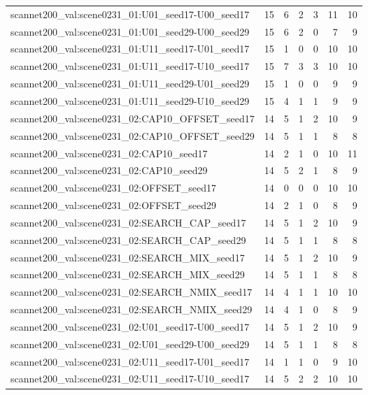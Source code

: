 \begin{table}[t]
\begin{tabular}{lrrrrrr}
scannet200\_val:scene0231\_01:U01\_seed17-U00\_seed17 & 15 & 6 & 2 & 3 & 11 & 10 \\
scannet200\_val:scene0231\_01:U01\_seed29-U00\_seed29 & 15 & 6 & 2 & 0 & 7 & 9 \\
scannet200\_val:scene0231\_01:U11\_seed17-U01\_seed17 & 15 & 1 & 0 & 0 & 10 & 10 \\
scannet200\_val:scene0231\_01:U11\_seed17-U10\_seed17 & 15 & 7 & 3 & 3 & 10 & 10 \\
scannet200\_val:scene0231\_01:U11\_seed29-U01\_seed29 & 15 & 1 & 0 & 0 & 9 & 9 \\
scannet200\_val:scene0231\_01:U11\_seed29-U10\_seed29 & 15 & 4 & 1 & 1 & 9 & 9 \\
scannet200\_val:scene0231\_02:CAP10\_OFFSET\_seed17 & 14 & 5 & 1 & 2 & 10 & 9 \\
scannet200\_val:scene0231\_02:CAP10\_OFFSET\_seed29 & 14 & 5 & 1 & 1 & 8 & 8 \\
scannet200\_val:scene0231\_02:CAP10\_seed17 & 14 & 2 & 1 & 0 & 10 & 11 \\
scannet200\_val:scene0231\_02:CAP10\_seed29 & 14 & 5 & 2 & 1 & 8 & 9 \\
scannet200\_val:scene0231\_02:OFFSET\_seed17 & 14 & 0 & 0 & 0 & 10 & 10 \\
scannet200\_val:scene0231\_02:OFFSET\_seed29 & 14 & 2 & 1 & 0 & 8 & 9 \\
scannet200\_val:scene0231\_02:SEARCH\_CAP\_seed17 & 14 & 5 & 1 & 2 & 10 & 9 \\
scannet200\_val:scene0231\_02:SEARCH\_CAP\_seed29 & 14 & 5 & 1 & 1 & 8 & 8 \\
scannet200\_val:scene0231\_02:SEARCH\_MIX\_seed17 & 14 & 5 & 1 & 2 & 10 & 9 \\
scannet200\_val:scene0231\_02:SEARCH\_MIX\_seed29 & 14 & 5 & 1 & 1 & 8 & 8 \\
scannet200\_val:scene0231\_02:SEARCH\_NMIX\_seed17 & 14 & 4 & 1 & 1 & 10 & 10 \\
scannet200\_val:scene0231\_02:SEARCH\_NMIX\_seed29 & 14 & 4 & 1 & 0 & 8 & 9 \\
scannet200\_val:scene0231\_02:U01\_seed17-U00\_seed17 & 14 & 5 & 1 & 2 & 10 & 9 \\
scannet200\_val:scene0231\_02:U01\_seed29-U00\_seed29 & 14 & 5 & 1 & 1 & 8 & 8 \\
scannet200\_val:scene0231\_02:U11\_seed17-U01\_seed17 & 14 & 1 & 1 & 0 & 9 & 10 \\
scannet200\_val:scene0231\_02:U11\_seed17-U10\_seed17 & 14 & 5 & 2 & 2 & 10 & 10 \\

\end{tabular}
\end{table}
